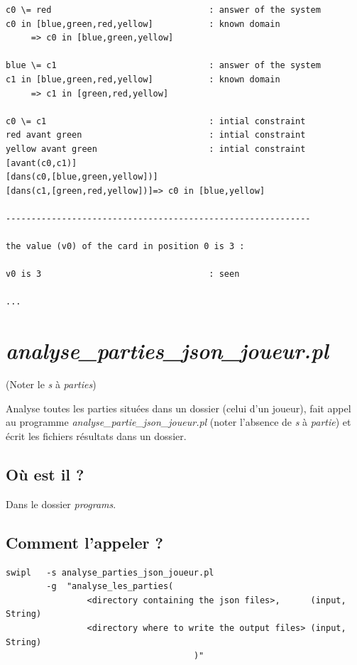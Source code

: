 \documentclass[a4paper,12pt]{article}
\begin{document}
\begin{enumerate}
\begin{Verbatim}
c0 \= red                               : answer of the system 
c0 in [blue,green,red,yellow]           : known domain 
     => c0 in [blue,green,yellow]

blue \= c1                              : answer of the system 
c1 in [blue,green,red,yellow]           : known domain 
     => c1 in [green,red,yellow]

c0 \= c1                                : intial constraint 
red avant green                         : intial constraint 
yellow avant green                      : intial constraint 
[avant(c0,c1)]
[dans(c0,[blue,green,yellow])]
[dans(c1,[green,red,yellow])]=> c0 in [blue,yellow]

------------------------------------------------------------

the value (v0) of the card in position 0 is 3 : 

v0 is 3                                 : seen 

...

\end{Verbatim}
		
\end{enumerate}

\section{\emph{analyse\_parties\_json\_joueur.pl}}

(Noter le \emph{s} à \emph{parties})

Analyse toutes les parties situées dans un dossier (celui d’un joueur), fait appel au programme
\emph{analyse\_partie\_json\_joueur.pl} (noter l’absence de \emph{s} à \emph{partie}) et écrit les fichiers 
résultats dans un
dossier.

\subsection*{Où est il ?}
	Dans le dossier \emph{programs}.
	
\subsection*{Comment l’appeler ?}
	
\begin{Verbatim}
swipl	-s analyse_parties_json_joueur.pl
		-g  "analyse_les_parties(
			  	<directory containing the json files>, 		(input, String)
			 	<directory where to write the output files>	(input, String)
							         )"
\end{Verbatim}
\end{document}
